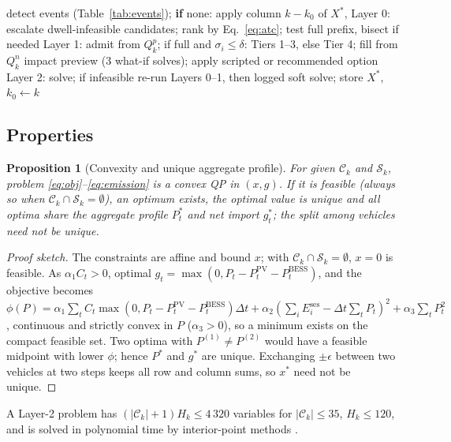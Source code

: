 \documentclass[preprint,12pt]{elsarticle}
\newtheorem{proposition}{Proposition}
\newcommand{\Ses}{E^{\mathrm{ses}}}
\newcommand{\Cset}{\mathcal{C}_k}
\newcommand{\Sset}{\mathcal{S}_k}
\begin{document}
\begin{algorithm}[!t]
\caption{One AQPS-RT-ET control step $k$}
\label{alg:aqps}
\footnotesize
\begin{algorithmic}[1]
\State detect events (Table~\ref{tab:events}); \textbf{if} none: apply column $k-k_0$ of $X^\ast$, \Return
{}
  \State Layer 0: escalate dwell-infeasible candidates; rank by Eq.~\eqref{eq:atc}; test full prefix, bisect if needed
\EndIf
{}
  \State Layer 1: admit from $Q^p_k$; if full and $\sigma_i\le\delta$: Tiers 1--3, else Tier 4; fill from $Q^n_k$
\EndIf
{} \State impact preview (3 what-if solves); apply scripted or recommended option \EndIf
\State Layer 2: solve; if infeasible re-run Layers 0--1, then logged soft solve; store $X^\ast$, $k_0\leftarrow k$
\end{algorithmic}
\end{algorithm}

\subsection{Properties}
\label{sec:theory}

\begin{proposition}[Convexity and unique aggregate profile]
\label{prop:convex}
For given $\Cset$ and $\Sset$, problem \eqref{eq:obj}--\eqref{eq:emission} is a convex QP in $(x,g)$. If it is
feasible (always so when $\Cset\cap\Sset=\emptyset$), an optimum exists, the optimal value is unique and all
optima share the aggregate profile $P^\ast_t$ and net import $g^\ast_t$; the split among vehicles need not be
unique.
\end{proposition}
\begin{proof}[Proof sketch]
The constraints are affine and bound $x$; with $\Cset\cap\Sset=\emptyset$, $x=0$ is feasible. As
$\alpha_1C_t>0$, optimal $g_t=\max(0,P_t-P^{\mathrm{PV}}_t-P^{\mathrm{BESS}}_t)$, and the objective becomes
$\phi(P)=\alpha_1\sum_tC_t\max(0,P_t-P^{\mathrm{PV}}_t-P^{\mathrm{BESS}}_t)\Delta t+\alpha_2(\sum_i\Ses_i-\Delta t\sum_tP_t)^2
+\alpha_3\sum_tP_t^2$, continuous and strictly convex in $P$ ($\alpha_3>0$), so a minimum exists on the
compact feasible set. Two optima with $P^{(1)}\ne P^{(2)}$ would have a feasible midpoint with lower $\phi$;
hence $P^\ast$ and $g^\ast$ are unique. Exchanging $\pm\epsilon$ between two vehicles at two steps keeps all
row and column sums, so $x^\ast$ need not be unique.
\end{proof}
A Layer-2 problem has $(|\Cset|+1)H_k\le4\,320$ variables for $|\Cset|\le35$, $H_k\le120$, and is solved in
polynomial time by interior-point methods \cite{boyd2004convex}.
\end{document}
